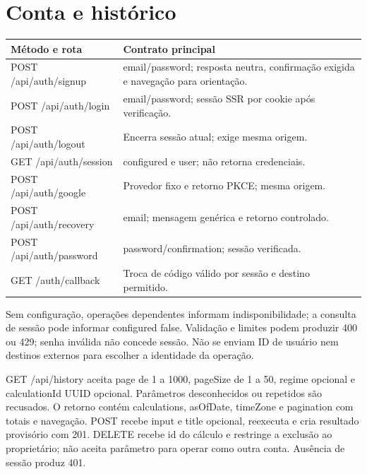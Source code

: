 \section{Conta e histórico}
\label{section-C-2}
\begin{quadro}[H]\centering
\caption{Rotas de conta}
\label{quadro-7}
\begin{singlespace}\fontsize{10}{12}\selectfont
\begin{tabularx}{\linewidth}{|>{\raggedright\arraybackslash}X|>{\raggedright\arraybackslash}X|}
\hline
\textbf{Método e rota} & \textbf{Contrato principal} \\
\hline
POST /api/auth/signup & email/password; resposta neutra, confirmação exigida e navegação para orientação. \\
\hline
POST /api/auth/login & email/password; sessão SSR por cookie após verificação. \\
\hline
POST /api/auth/logout & Encerra sessão atual; exige mesma origem. \\
\hline
GET /api/auth/session & configured e user; não retorna credenciais. \\
\hline
POST /api/auth/google & Provedor fixo e retorno PKCE; mesma origem. \\
\hline
POST /api/auth/recovery & email; mensagem genérica e retorno controlado. \\
\hline
POST /api/auth/password & password/confirmation; sessão verificada. \\
\hline
GET /auth/callback & Troca de código válido por sessão e destino permitido. \\
\hline
\end{tabularx}\end{singlespace}
\par{}
\end{quadro}
Sem configuração, operações dependentes informam indisponibilidade; a consulta de sessão pode informar configured false. Validação e limites podem produzir 400 ou 429; senha inválida não concede sessão. Não se enviam ID de usuário nem destinos externos para escolher a identidade da operação.

GET /api/history aceita page de 1 a 1000, pageSize de 1 a 50, regime opcional e calculationId UUID opcional. Parâmetros desconhecidos ou repetidos são recusados. O retorno contém calculations, asOfDate, timeZone e pagination com totais e navegação. POST recebe input e title opcional, reexecuta e cria resultado provisório com 201. DELETE recebe id do cálculo e restringe a exclusão ao proprietário; não aceita parâmetro para operar como outra conta. Ausência de sessão produz 401.

